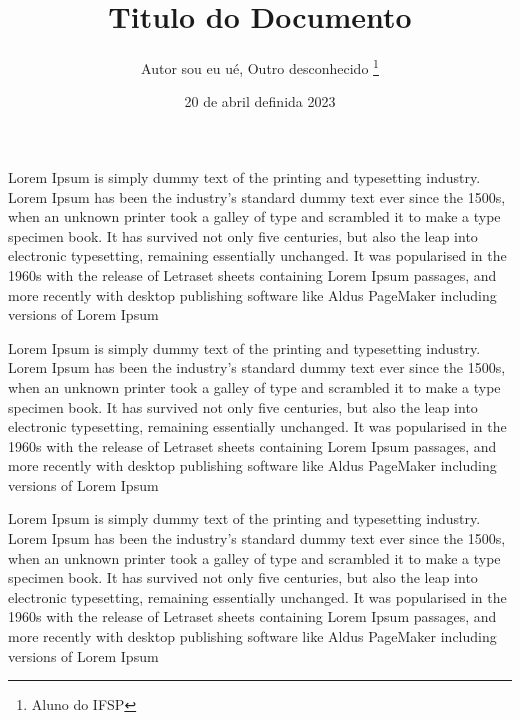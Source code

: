 \documentclass[12pt, a4paper, onside]{article}
\begin{document}
\title{Titulo do Documento}
\author{Autor sou eu ué, Outro desconhecido \footnote{Aluno do IFSP}}  %
\date{20 de abril definida 2023} %
\onehalfspacing 
\begin{flushleft}
Lorem Ipsum is simply dummy text of the printing and typesetting industry. Lorem Ipsum has been the industry's standard dummy text ever since the 1500s, when an unknown printer took a galley of type and scrambled it to make a type specimen book. It has survived not only five centuries, but also the leap into electronic typesetting, remaining essentially unchanged. It was popularised in the 1960s with the release of Letraset sheets containing Lorem Ipsum passages, and more recently with desktop publishing software like Aldus PageMaker including versions of Lorem Ipsum
\end{flushleft}

\begin{flushright}
Lorem Ipsum is simply dummy text of the printing and typesetting industry. Lorem Ipsum has been the industry's standard dummy text ever since the 1500s, when an unknown printer took a galley of type and scrambled it to make a type specimen book. It has survived not only five centuries, but also the leap into electronic typesetting, remaining essentially unchanged. It was popularised in the 1960s with the release of Letraset sheets containing Lorem Ipsum passages, and more recently with desktop publishing software like Aldus PageMaker including versions of Lorem Ipsum
\end{flushright}

Lorem Ipsum is simply dummy text of the printing and typesetting industry. Lorem Ipsum has been the industry's standard dummy text ever since the 1500s, when an unknown printer took a galley of type and scrambled it to make a type specimen book. It has survived not only five centuries, but also the leap into electronic typesetting, remaining essentially unchanged. It was popularised in the 1960s with the release of Letraset sheets containing Lorem Ipsum passages, and more recently with desktop publishing software like Aldus PageMaker including versions of Lorem Ipsum
\\
\end{document}
